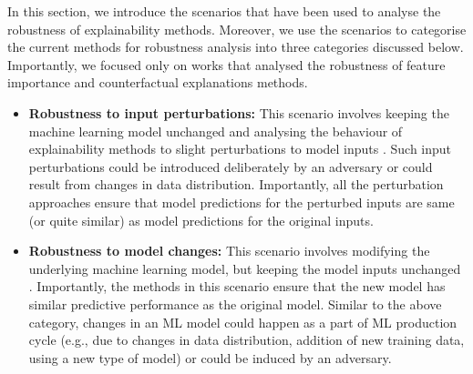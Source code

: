 \documentclass[sigconf]{acmart}
\newcommand{\s}[1]{\textcolor{red}{#1}}
\begin{document}

In this section, we introduce the scenarios that have been used to analyse the robustness of explainability methods. Moreover, we use the scenarios to categorise the current methods for robustness analysis into three categories discussed below. Importantly, we focused only on works that analysed the robustness of feature importance and counterfactual explanations methods.

\begin{itemize}
    \item \textbf{Robustness to input perturbations:} This scenario involves keeping the machine learning model unchanged and analysing the behaviour of explainability methods to slight perturbations to model inputs \cite{Kindermans_arXiv_2017, Melis_arXiv_2018, Dombrowski_neurips_2019, Ghorbani_aaai_2019,slack2021counterfactual,dominguez2022adversarial}. Such input perturbations could be introduced deliberately by an adversary or could result from changes in data distribution. Importantly, all the perturbation approaches ensure that model predictions for the perturbed inputs are same (or quite similar) as model predictions for the original inputs. 
    
    \item \textbf{Robustness to model changes:} This scenario involves modifying the underlying machine learning model, but keeping the model inputs unchanged \cite{Adebayo_neurips_2018, Heo_neurips_2019, Dimanov_aaai_ws_2020, Anders_arXiv_2020, Slack_aies_2020,rawal2020can,upadhyay2021towards,dutta2022robust,black_consistent_2021}. Importantly, the methods in this scenario ensure that the new model has similar predictive performance as the original model. Similar to the above category, changes in an ML model could happen as a part of ML production cycle (e.g., due to changes in data distribution, addition of new training data, using a new type of model) or could be induced by an adversary.




\end{itemize}
\end{document}
